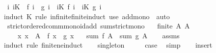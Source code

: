 \begin{isabellebody}
\ \ {\isachardoublequoteopen}{\isacharparenleft}{\kern0pt}{\isasymAnd}i{\isachardot}{\kern0pt}\ i{\isasymin}K\ {\isasymLongrightarrow}\ f\ i\ {\isasymle}\ g\ i{\isacharparenright}{\kern0pt}\ {\isasymLongrightarrow}\ {\isacharparenleft}{\kern0pt}{\isasymSum}i{\isasymin}K{\isachardot}{\kern0pt}\ f\ i{\isacharparenright}{\kern0pt}\ {\isasymle}\ {\isacharparenleft}{\kern0pt}{\isasymSum}i{\isasymin}K{\isachardot}{\kern0pt}\ g\ i{\isacharparenright}{\kern0pt}{\isachardoublequoteclose}\isanewline
%
\isadelimproof
\ \ %
\endisadelimproof
%
\isatagproof
{}\isamarkupfalse%
\ {\isacharparenleft}{\kern0pt}induct\ K\ rule{\isacharcolon}{\kern0pt}\ infinite{\isacharunderscore}{\kern0pt}finite{\isacharunderscore}{\kern0pt}induct{\isacharparenright}{\kern0pt}\ {\isacharparenleft}{\kern0pt}use\ add{\isacharunderscore}{\kern0pt}mono\ \ auto{\isacharparenright}{\kern0pt}%
\endisatagproof
{\isafoldproof}%
%
\isadelimproof
\isanewline
%
\endisadelimproof
\isanewline
{}\isamarkupfalse%
\ {\isacharparenleft}{\kern0pt}\ strict{\isacharunderscore}{\kern0pt}ordered{\isacharunderscore}{\kern0pt}comm{\isacharunderscore}{\kern0pt}monoid{\isacharunderscore}{\kern0pt}add{\isacharparenright}{\kern0pt}\ sum{\isacharunderscore}{\kern0pt}strict{\isacharunderscore}{\kern0pt}mono{\isacharcolon}{\kern0pt}\isanewline
\ \ \ {\isachardoublequoteopen}finite\ A{\isachardoublequoteclose}\ {\isachardoublequoteopen}A\ {\isasymnoteq}\ {\isacharbraceleft}{\kern0pt}{\isacharbraceright}{\kern0pt}{\isachardoublequoteclose}\isanewline
\ \ \ \ \ {\isachardoublequoteopen}{\isasymAnd}x{\isachardot}{\kern0pt}\ x\ {\isasymin}\ A\ {\isasymLongrightarrow}\ f\ x\ {\isacharless}{\kern0pt}\ g\ x{\isachardoublequoteclose}\isanewline
\ \ \ {\isachardoublequoteopen}sum\ f\ A\ {\isacharless}{\kern0pt}\ sum\ g\ A{\isachardoublequoteclose}\isanewline
%
\isadelimproof
\ \ %
\endisadelimproof
%
\isatagproof
{}\isamarkupfalse%
\ assms\isanewline
{}\isamarkupfalse%
\ {\isacharparenleft}{\kern0pt}induct\ rule{\isacharcolon}{\kern0pt}\ finite{\isacharunderscore}{\kern0pt}ne{\isacharunderscore}{\kern0pt}induct{\isacharparenright}{\kern0pt}\isanewline
\ \ \isamarkupfalse%
\ singleton\isanewline
\ \ \isamarkupfalse%
\ \isamarkupfalse%
\ {\isacharquery}{\kern0pt}case\ \isamarkupfalse%
\ simp\isanewline
{}\isamarkupfalse%
\isanewline
\ \ \isamarkupfalse%
\ insert\isanewline
\ \ \isamarkupfalse%

\end{isabellebody}

